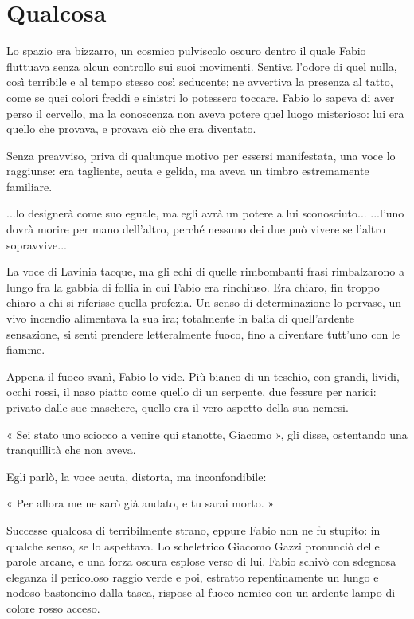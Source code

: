 \chapter{Qualcosa}

Lo spazio era bizzarro, un cosmico pulviscolo oscuro dentro il quale Fabio fluttuava senza alcun controllo sui suoi movimenti. Sentiva l'odore di quel nulla, così terribile e al tempo stesso così seducente; ne avvertiva la presenza al tatto, come se quei colori freddi e sinistri lo potessero toccare. Fabio lo sapeva di aver perso il cervello, ma la conoscenza non aveva potere quel luogo misterioso: lui era quello che provava, e provava ciò che era diventato.

Senza preavviso, priva di qualunque motivo per essersi manifestata, una voce lo raggiunse: era tagliente, acuta e gelida, ma aveva un timbro estremamente familiare.

...lo designerà come suo eguale, ma egli avrà un potere a lui sconosciuto...
...l'uno dovrà morire per mano dell'altro, perché nessuno dei due può vivere se l'altro sopravvive...

La voce di Lavinia tacque, ma gli echi di quelle rimbombanti frasi rimbalzarono a lungo fra la gabbia di follia in cui Fabio era rinchiuso. Era chiaro, fin troppo chiaro a chi si riferisse quella profezia. Un senso di determinazione lo pervase, un vivo incendio alimentava la sua ira; totalmente in balia di quell'ardente sensazione, si sentì prendere letteralmente fuoco, fino a diventare tutt'uno con le fiamme.

Appena il fuoco svanì, Fabio lo vide. Più bianco di un teschio, con grandi, lividi, occhi rossi, il naso piatto come quello di un serpente, due fessure per narici: privato dalle sue maschere, quello era il vero aspetto della sua nemesi.

« Sei stato uno sciocco a venire qui stanotte, Giacomo », gli disse, ostentando una tranquillità che non aveva.

Egli parlò, la voce acuta, distorta, ma inconfondibile:

« Per allora me ne sarò già andato, e tu sarai morto. »

Successe qualcosa di terribilmente strano, eppure Fabio non ne fu stupito: in qualche senso, se lo aspettava. Lo scheletrico Giacomo Gazzi pronunciò delle parole arcane, e una forza oscura esplose verso di lui. Fabio schivò con sdegnosa eleganza il pericoloso raggio verde e poi, estratto repentinamente un lungo e nodoso bastoncino dalla tasca, rispose al fuoco nemico con un ardente lampo di colore rosso acceso.

